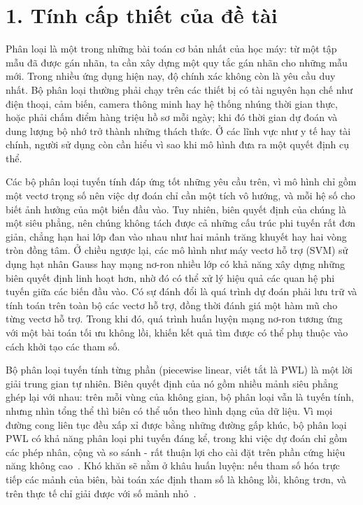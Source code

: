 
\section*{1. Tính cấp thiết của đề tài}

Phân loại là một trong những bài toán cơ bản nhất của học máy: từ một tập mẫu đã được gán nhãn, ta cần xây dựng một quy tắc gán nhãn cho những mẫu mới. Trong nhiều ứng dụng hiện nay, độ chính xác không còn là yêu cầu duy nhất. Bộ phân loại thường phải chạy trên các thiết bị có tài nguyên hạn chế như điện thoại, cảm biến, camera thông minh hay hệ thống nhúng thời gian thực, hoặc phải chấm điểm hàng triệu hồ sơ mỗi ngày; khi đó thời gian dự đoán và dung lượng bộ nhớ trở thành những thách thức. Ở các lĩnh vực như y tế hay tài chính, người sử dụng còn cần hiểu vì sao khi mô hình đưa ra một quyết định cụ thể.

Các bộ phân loại tuyến tính đáp ứng tốt những yêu cầu trên, vì mô hình chỉ gồm một vectơ trọng số nên việc dự đoán chỉ cần một tích vô hướng, và mỗi hệ số cho biết ảnh hưởng của một biến đầu vào. Tuy nhiên, biên quyết định của chúng là một siêu phẳng, nên chúng không tách được cả những cấu trúc phi tuyến rất đơn giản, chẳng hạn hai lớp đan vào nhau như hai mảnh trăng khuyết hay hai vòng tròn đồng tâm. Ở chiều ngược lại, các mô hình như máy vectơ hỗ trợ (SVM) sử dụng hạt nhân Gauss hay mạng nơ-ron nhiều lớp có khả năng xây dựng những biên quyết định linh hoạt hơn, nhờ đó có thể xử lý hiệu quả các quan hệ phi tuyến giữa các biến đầu vào. Có sự đánh đổi là quá trình dự đoán phải lưu trữ và tính toán trên toàn bộ các vectơ hỗ trợ, đồng thời đánh giá một hàm mũ cho từng vectơ hỗ trợ. Trong khi đó, quá trình huấn luyện mạng nơ-ron tương ứng với một bài toán tối ưu không lồi, khiến kết quả tìm được có thể phụ thuộc vào cách khởi tạo các tham số.

Bộ phân loại tuyến tính từng phần (piecewise linear, viết tắt là PWL) là một lời giải trung gian tự nhiên. Biên quyết định của nó gồm nhiều mảnh siêu phẳng ghép lại với nhau: trên mỗi vùng của không gian, bộ phân loại vẫn là tuyến tính, nhưng nhìn tổng thể thì biên có thể uốn theo hình dạng của dữ liệu. Vì mọi đường cong liên tục đều xấp xỉ được bằng những đường gấp khúc, bộ phân loại PWL có khả năng phân loại phi tuyến đáng kể, trong khi việc dự đoán chỉ gồm các phép nhân, cộng và so sánh - rất thuận lợi cho cài đặt trên phần cứng hiệu năng không cao~\cite{kostin2006,webb2010}. Khó khăn sẽ nằm ở khâu huấn luyện: nếu tham số hóa trực tiếp các mảnh của biên, bài toán xác định tham số là không lồi, không trơn, và trên thực tế chỉ giải được với số mảnh nhỏ~\cite{bagirov2005}.

